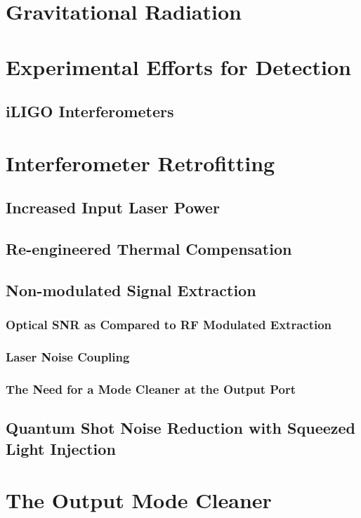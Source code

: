 \documentclass[12pt,vi,twoside]{mitthesis}
\begin{document}

\pagestyle{plain}

%


\chapter{Gravitational Radiation}

\chapter{Experimental Efforts for Detection}
\section{iLIGO Interferometers}

\chapter{Interferometer Retrofitting}
\section{Increased Input Laser Power}
\section{Re-engineered Thermal Compensation}
\section{Non-modulated Signal Extraction}
\subsection{Optical SNR as Compared to RF Modulated Extraction}
\subsection{Laser Noise Coupling}
\subsection{The Need for a Mode Cleaner at the Output Port}
\section{Quantum Shot Noise Reduction with Squeezed Light Injection}

\chapter{The Output Mode Cleaner}
\end{document}
